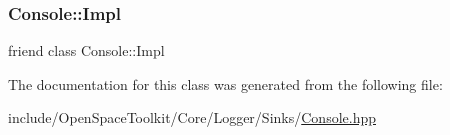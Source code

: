 \subsubsection{\texorpdfstring{Console\+::\+Impl}{Console::Impl}}
{\footnotesize\ttfamily friend class Console\+::\+Impl\hspace{0.3cm}{\ttfamily [friend]}}



The documentation for this class was generated from the following file\+:\begin{DoxyCompactItemize}
\item 
include/\+Open\+Space\+Toolkit/\+Core/\+Logger/\+Sinks/\hyperlink{_console_8hpp}{Console.\+hpp}\end{DoxyCompactItemize}
